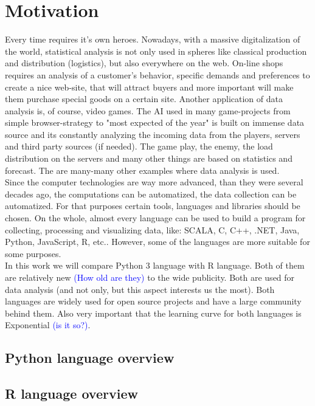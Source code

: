 \documentclass{article}
\begin{document}
\newpage
\section{Motivation}
Every time requires it's own heroes. Nowadays, with a massive digitalization of the world, statistical analysis is not only used in spheres like classical production and distribution (logistics), but also everywhere on the web. On-line shops requires an analysis of a customer's behavior, specific demands and preferences to create a nice web-site, that will attract buyers and more important will make them purchase special goods on a certain site. Another application of data analysis is, of course, video games. The AI used in many game-projects from simple browser-strategy to "most expected of the year" is built on immense data source and its constantly analyzing the incoming data from the players, servers and third party sources (if needed). The game play, the enemy, the load distribution on the servers and many other things are based on statistics and forecast. The are many-many other examples where data analysis is used.\vspace{3mm}\\
Since the computer technologies are way more advanced, than they were several decades ago, the computations can be automatized, the data collection can be automatized. For that purposes certain tools, languages and libraries should be chosen. On the whole, almost every language can be used to build a program for collecting, processing and visualizing data, like: SCALA, C, C++, .NET, Java, Python, JavaScript, R, etc.. However, some of the languages are more suitable for some purposes.\vspace{3mm}\\
In this work we will compare Python 3 language with R language. Both of them are relatively new \textcolor{blue}{(How old are they)} to the wide publicity. Both are used for data analysis (and not only, but this aspect interests us the most). Both languages are widely used for open source projects and have a large community behind them. Also very important that the learning curve for both languages is Exponential \textcolor{blue}{(is it so?)}.
 
\subsection{Python language overview}

\subsection{R language overview}
\end{document}
